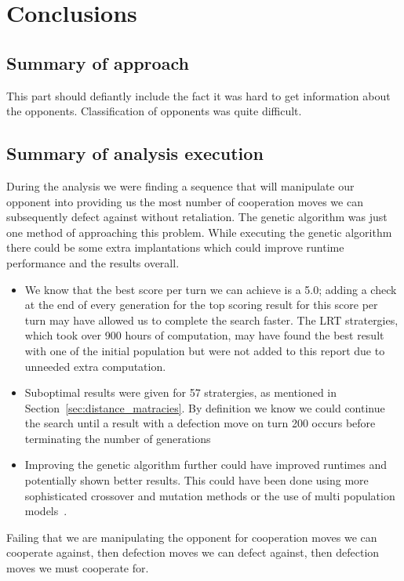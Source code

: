 \chapter{Conclusions}\label{ch:conclusions}

\section{Summary of approach}
This part should defiantly include the fact it was hard to get information about the opponents.
Classification of opponents was quite difficult.

\section{Summary of analysis execution}
During the analysis we were finding a sequence that will manipulate our opponent into providing us the most number of cooperation moves we can subsequently defect against without retaliation.
The genetic algorithm was just one method of approaching this problem.
While executing the genetic algorithm there could be some extra implantations which could improve runtime performance and the results overall.
\begin{itemize}
    \item {We know that the best score per turn we can achieve is a 5.0; adding a check at the end of every generation for the top scoring result for this score per turn may have allowed us to complete the search faster.
    The LRT stratergies, which took over 900 hours of computation, may have found the best result with one of the initial population but were not added to this report due to unneeded extra computation.}
    \item {Suboptimal results were given for 57 stratergies, as mentioned in Section~\ref{sec:distance_matracies}.
    By definition we know we could continue the search until a result with a defection move on turn 200 occurs before terminating the number of generations} 
    \item {Improving the genetic algorithm further could have improved runtimes and potentially shown better results.
    This could have been done using more sophisticated crossover and mutation methods or the use of multi population models~\cite{whitley2012genetic}.}
\end{itemize}

Failing that we are manipulating the opponent for cooperation moves we can cooperate against, then defection moves we can defect against, then defection moves we must cooperate for.

